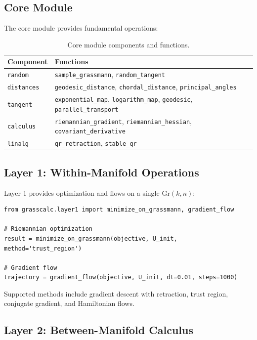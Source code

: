 \documentclass[11pt,a4paper]{article}
\newcommand{\Gr}{\mathrm{Gr}}
\begin{document}
\subsection{Core Module}

The core module provides fundamental operations:

\begin{table}[h]
\centering
\begin{tabular}{ll}
\toprule
\textbf{Component} & \textbf{Functions} \\
\midrule
\texttt{random} & \texttt{sample\_grassmann}, \texttt{random\_tangent} \\
\texttt{distances} & \texttt{geodesic\_distance}, \texttt{chordal\_distance}, \texttt{principal\_angles} \\
\texttt{tangent} & \texttt{exponential\_map}, \texttt{logarithm\_map}, \texttt{geodesic}, \texttt{parallel\_transport} \\
\texttt{calculus} & \texttt{riemannian\_gradient}, \texttt{riemannian\_hessian}, \texttt{covariant\_derivative} \\
\texttt{linalg} & \texttt{qr\_retraction}, \texttt{stable\_qr} \\
\bottomrule
\end{tabular}
\caption{Core module components and functions.}
\label{tab:core}
\end{table}

\subsection{Layer 1: Within-Manifold Operations}

Layer 1 provides optimization and flows on a single $\Gr(k,n)$:

\begin{lstlisting}[caption={Layer 1 optimization example}]
from grasscalc.layer1 import minimize_on_grassmann, gradient_flow

# Riemannian optimization
result = minimize_on_grassmann(objective, U_init, method='trust_region')

# Gradient flow
trajectory = gradient_flow(objective, U_init, dt=0.01, steps=1000)
\end{lstlisting}

Supported methods include gradient descent with retraction, trust region, conjugate gradient, and Hamiltonian flows.

\subsection{Layer 2: Between-Manifold Calculus}
\end{document}
